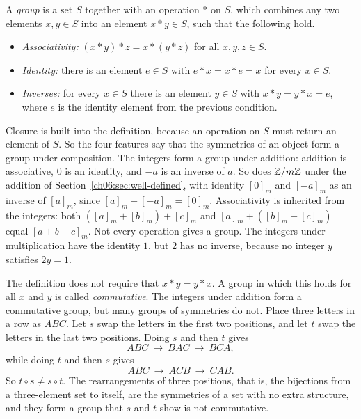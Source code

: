 \par\noindent\begin{minipage}{\linewidth}
\begin{definition}[Group]\label{ch06:def:group}
A \emph{group} is a set $S$ together with an operation $*$ on $S$, which combines any two elements $x,y\in S$ into an element $x*y\in S$, such that the following hold.
\begin{itemize}
\item \emph{Associativity:} $(x*y)*z=x*(y*z)$ for all $x,y,z\in S$.
\item \emph{Identity:} there is an element $e\in S$ with $e*x=x*e=x$ for every $x\in S$.
\item \emph{Inverses:} for every $x\in S$ there is an element $y\in S$ with $x*y=y*x=e$, where $e$ is the identity element from the previous condition.
\end{itemize}
\end{definition}
\end{minipage}\par

Closure is built into the definition, because an operation on $S$ must return an element of $S$. So the four features say that the symmetries of an object form a group under composition. The integers form a group under addition: addition is associative, $0$ is an identity, and $-a$ is an inverse of $a$. So does $\mathbb Z/m\mathbb Z$ under the addition of Section~\ref{ch06:sec:well-defined}, with identity $[0]_m$ and $[-a]_m$ as an inverse of $[a]_m$, since $[a]_m+[-a]_m=[0]_m$. Associativity is inherited from the integers: both $([a]_m+[b]_m)+[c]_m$ and $[a]_m+([b]_m+[c]_m)$ equal $[a+b+c]_m$. Not every operation gives a group. The integers under multiplication have the identity $1$, but $2$ has no inverse, because no integer $y$ satisfies $2y=1$.

The definition does not require that $x*y=y*x$. A group in which this holds for all $x$ and $y$ is called \emph{commutative}. The integers under addition form a commutative group, but many groups of symmetries do not. Place three letters in a row as $ABC$. Let $s$ swap the letters in the first two positions, and let $t$ swap the letters in the last two positions. Doing $s$ and then $t$ gives
\[
ABC\ \to\ BAC\ \to\ BCA,
\]
while doing $t$ and then $s$ gives
\[
ABC\ \to\ ACB\ \to\ CAB.
\]
So $t\circ s\ne s\circ t$. The rearrangements of three positions, that is, the bijections from a three-element set to itself, are the symmetries of a set with no extra structure, and they form a group that $s$ and $t$ show is not commutative.

